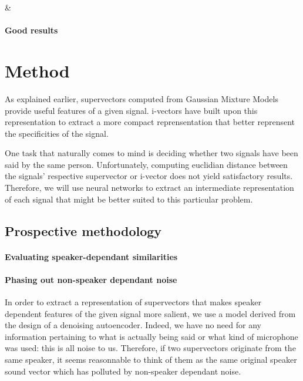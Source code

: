 \documentclass[conference]{IEEEtran}
\begin{document}
& \paragraph{Good results}

\section{Method}

As explained earlier, supervectors computed from Gaussian Mixture Models provide
useful features of a given signal. i-vectors have built upon this representation
to extract a more compact reprensentation that better reprensent the
specificities of the signal.

One task that naturally comes to mind is deciding whether two signals have been
said by the same person. Unfortunately, computing euclidian distance between the signals'
respective supervector or i-vector does not yield satisfactory results.
Therefore, we will use neural networks to extract an intermediate representation
of each signal that might be better suited to this particular problem.

\subsection{Prospective methodology}

\paragraph{Evaluating speaker-dependant similarities}


\paragraph{Phasing out non-speaker dependant noise}

In order to extract a representation of supervectors that makes speaker
dependent features of the given signal more salient, we use a model derived from
the design of a denoising autoencoder. Indeed, we have no need for any
information pertaining to what is actually being said or what kind of microphone
was used: this is all noise to us. Therefore, if two supervectors originate from
the same speaker, it seems reasonnable to think of them as the same original \og
speaker\fg{} sound vector which has polluted by non-speaker dependant noise.
\end{document}
